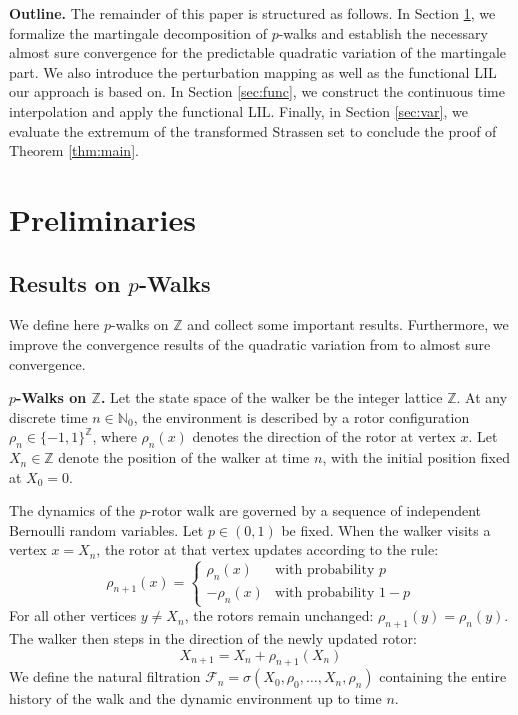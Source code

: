 \documentclass[11pt]{article}
\theoremstyle{remark}
\newcommand{\Z}{\mathbb{Z}}
\begin{document}
\textbf{Outline.} The remainder of this paper is structured as follows. In Section \ref{sec:prelim}, we formalize the martingale decomposition of $p$-walks and establish the necessary almost sure convergence for the predictable quadratic variation of the martingale part. We also introduce the perturbation mapping as well as the functional LIL our approach is based on. In Section \ref{sec:func}, we construct the continuous time interpolation and apply the functional LIL. Finally, in Section \ref{sec:var}, we evaluate the extremum of the transformed Strassen set to conclude the proof of Theorem \ref{thm:main}.

\section{Preliminaries}\label{sec:prelim}
\subsection{Results on $p$-Walks}
We define here $p$-walks on $\Z$ and collect some important results. Furthermore, we improve the convergence results of the quadratic variation from \cite{HLSH18} to almost sure convergence.

\textbf{$p$-Walks on $\Z$.} Let the state space of the walker be the integer lattice $\mathbb{Z}$. At any discrete time $n \in \mathbb{N}_0$, the environment is described by a rotor configuration $\rho_n \in \{-1, 1\}^{\mathbb{Z}}$, where $\rho_n(x)$ denotes the direction of the rotor at vertex $x$. Let $X_n \in \mathbb{Z}$ denote the position of the walker at time $n$, with the initial position fixed at $X_0 = 0$.

The dynamics of the $p$-rotor walk are governed by a sequence of independent Bernoulli random variables. Let $p \in (0,1)$ be fixed. When the walker visits a vertex $x = X_n$, the rotor at that vertex updates according to the rule:
$$\rho_{n+1}(x) = 
\begin{cases} 
\rho_n(x) & \text{with probability } p \\
-\rho_n(x) & \text{with probability } 1-p 
\end{cases}$$
For all other vertices $y \neq X_n$, the rotors remain unchanged: $\rho_{n+1}(y) = \rho_n(y)$. The walker then steps in the direction of the newly updated rotor:
$$X_{n+1} = X_n + \rho_{n+1}(X_n)$$
We define the natural filtration $\mathcal{F}_n = \sigma(X_0, \rho_0, \dots, X_n, \rho_n)$ containing the entire history of the walk and the dynamic environment up to time $n$.
\end{document}
